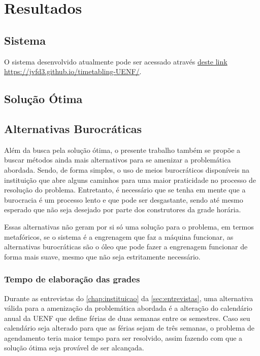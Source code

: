 \chapter{Resultados} \label{chap:resultados} %

\section{Sistema} %

O sistema desenvolvido atualmente pode ser acessado através \href{https://jvfd3.github.io/timetabling-UENF/}{deste link} \url{https://jvfd3.github.io/timetabling-UENF/}.

\section{Solução Ótima} %

\section{Alternativas Burocráticas} %

Além da busca pela solução ótima, o presente trabalho também se propõe a buscar métodos ainda mais alternativos para se amenizar a problemática abordada. Sendo, de forma simples, o uso de meios burocráticos disponíveis na instituição que abre alguns caminhos para uma maior praticidade no processo de resolução do problema. Entretanto, é necessário que se tenha em mente que a burocracia é um processo lento e que pode ser desgastante, sendo até mesmo esperado que não seja desejado por parte dos construtores da grade horária.

Essas alternativas não geram por si só uma solução para o problema, em termos metafóricos, se o sistema é a engrenagem que faz a máquina funcionar, as alternativas burocráticas são o óleo que pode fazer a engrenagem funcionar de forma mais suave, mesmo que não seja estritamente necessário.

\subsection{Tempo de elaboração das grades} %

Durante as entrevistas do \autoref{chap:instituicao} da \autoref{sec:entrevistas}, uma alternativa válida para a amenização da problemática abordada é a alteração do calendário anual da UENF que define férias de duas semanas entre os semestres. Caso seu calendário seja alterado para que as férias sejam de três semanas, o problema de agendamento teria maior tempo para ser resolvido, assim fazendo com que a solução ótima seja provável de ser alcançada.


